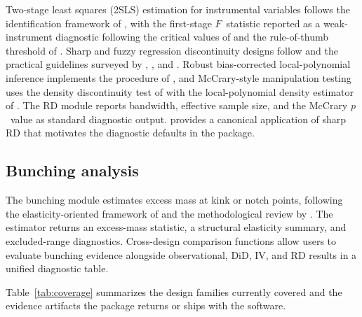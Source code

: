 \documentclass[article]{jss}
\begin{document}
Two-stage least squares (2SLS) estimation for instrumental variables
follows the identification framework of \citet{AngristImbensRubin1996}, with
the first-stage $F$~statistic reported as a weak-instrument diagnostic
following the critical values of \citet{StockYogo2005} and the rule-of-thumb
threshold of \citet{StaigerStock1997}. Sharp and fuzzy regression
discontinuity designs follow
\citet{HahnToddVanDerKlaauw2001} and the practical guidelines surveyed by
\citet{ImbensLemieux2008}, \citet{LeeLemieux2010}, and
\citet{CattaneoTitiunik2022}. Robust bias-corrected local-polynomial
inference implements the procedure of \citet{CalonicoCattaneoTitiunik2014},
and McCrary-style manipulation testing uses the density discontinuity test of
\citet{McCrary2008} with the local-polynomial density estimator of
\citet{CattaneoJanssonMa2020}. The RD module reports bandwidth, effective
sample size, and the McCrary $p$~value as standard diagnostic output.
\citet{Lee2008} provides a canonical application of sharp RD that motivates
the diagnostic defaults in the package.

\subsection{Bunching analysis}\label{sec:bunching}

The bunching module estimates excess mass at kink or notch points,
following the elasticity-oriented framework of
\citet{Saez2010} and the methodological review by \citet{Kleven2016}. The
estimator returns an excess-mass statistic, a structural elasticity
summary, and excluded-range diagnostics. Cross-design comparison functions
allow users to evaluate bunching evidence alongside observational, DiD, IV,
and RD results in a unified diagnostic table.

Table~\ref{tab:coverage} summarizes the design families currently covered
and the evidence artifacts the package returns or ships with the software.
\end{document}
